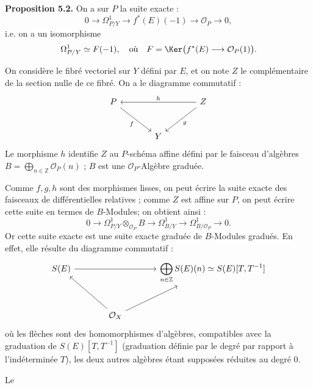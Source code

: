 \textbf{Proposition 5.2.} On a sur \(P\) la suite exacte :
\[
0\longrightarrow\Omega^1_{P/Y}\longrightarrow f^*(E)(-1)\longrightarrow\mathcal O_P\longrightarrow0,
\]
i.e. on a un isomorphisme
\[
\Omega^1_{P/Y}\simeq F(-1),\quad\text{où}\quad F=\Ker\bigl(f^*(E)\longrightarrow\mathcal O_P(1)\bigr).
\]

On considère le fibré vectoriel sur \(Y\) défini par \(E\), et on note \(Z\) le complémentaire de la section nulle de ce fibré. On a le diagramme commutatif :
\[
\begin{tikzcd}[column sep=large,row sep=large]
P \arrow[dr,"f"'] && Z \arrow[ll,"h"'] \arrow[dl,"g"]\\
& Y &
\end{tikzcd}
\]
Le morphisme \(h\) identifie \(Z\) au \(P\)-schéma affine défini par le faisceau d'algèbres \(B=\bigoplus_{n\in\mathbb Z}\mathcal O_P(n)\) ; \(B\) est une \(\mathcal O_P\)-Algèbre graduée.

Comme \(f,g,h\) sont des morphismes lisses, on peut écrire la suite exacte des faisceaux de différentielles relatives ; comme \(Z\) est affine sur \(P\), on peut écrire cette suite en termes de \(B\)-Modules; on obtient ainsi :
\begin{equation}\tag{5.2.1}
0\longrightarrow
 \Omega^1_{P/Y}\otimes_{\mathcal O_P}B
\longrightarrow
 \Omega^1_{B/Y}
\longrightarrow
 \Omega^1_{B/\mathcal O_P}
\longrightarrow0 .
\end{equation}
Or cette suite exacte est une suite exacte graduée de \(B\)-Modules gradués. En effet, elle résulte du diagramme commutatif :
\[
\begin{tikzcd}[column sep=large,row sep=large]
S(E) \arrow[rr] && \displaystyle\bigoplus_{n\in\mathbb Z}S(E)(n)\simeq S(E)[T,T^{-1}]\\
& \mathcal O_X \arrow[ul] \arrow[ur] &
\end{tikzcd}
\]
où les flèches sont des homomorphismes d'algèbres, compatibles avec la graduation de \(S(E)[T,T^{-1}]\) (graduation définie par le degré par rapport à l'indéterminée \(T\)), les deux autres algèbres étant supposées réduites au degré \(0\).

Le
